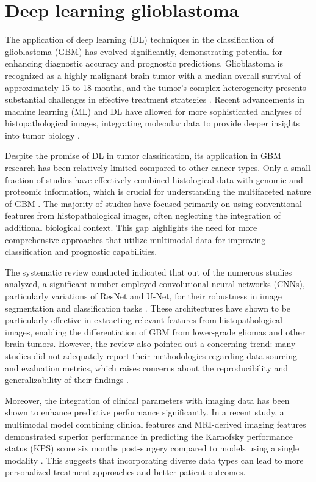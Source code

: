 \documentclass[runningheads]{llncs}
\begin{document}
\section{Deep learning glioblastoma}
The application of deep learning (DL) techniques in the classification of glioblastoma (GBM) has evolved significantly, demonstrating potential for enhancing diagnostic accuracy and prognostic predictions. Glioblastoma is recognized as a highly malignant brain tumor with a median overall survival of approximately 15 to 18 months, and the tumor's complex heterogeneity presents substantial challenges in effective treatment strategies \cite{Chun_2025}. Recent advancements in machine learning (ML) and DL have allowed for more sophisticated analyses of histopathological images, integrating molecular data to provide deeper insights into tumor biology \cite{Tomoki_2024}.

Despite the promise of DL in tumor classification, its application in GBM research has been relatively limited compared to other cancer types. Only a small fraction of studies have effectively combined histological data with genomic and proteomic information, which is crucial for understanding the multifaceted nature of GBM \cite{Chun_2025}. The majority of studies have focused primarily on using conventional features from histopathological images, often neglecting the integration of additional biological context. This gap highlights the need for more comprehensive approaches that utilize multimodal data for improving classification and prognostic capabilities.

The systematic review conducted indicated that out of the numerous studies analyzed, a significant number employed convolutional neural networks (CNNs), particularly variations of ResNet and U-Net, for their robustness in image segmentation and classification tasks \cite{Tomoki_2024}. These architectures have shown to be particularly effective in extracting relevant features from histopathological images, enabling the differentiation of GBM from lower-grade gliomas and other brain tumors. However, the review also pointed out a concerning trend: many studies did not adequately report their methodologies regarding data sourcing and evaluation metrics, which raises concerns about the reproducibility and generalizability of their findings \cite{Chun_2025}.

Moreover, the integration of clinical parameters with imaging data has been shown to enhance predictive performance significantly. In a recent study, a multimodal model combining clinical features and MRI-derived imaging features demonstrated superior performance in predicting the Karnofsky performance status (KPS) score six months post-surgery compared to models using a single modality \cite{Tomoki_2024}. This suggests that incorporating diverse data types can lead to more personalized treatment approaches and better patient outcomes.
\end{document}
